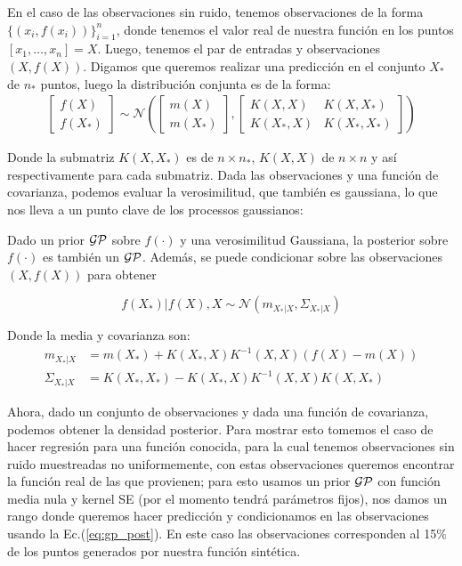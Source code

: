  En el caso de las observaciones sin ruido, tenemos observaciones de la forma $\{(x_i, f(x_i))\}_{i=1}^{n}$, donde tenemos el valor real de nuestra función en los puntos $[x_1, \ldots, x_n]=X$. Luego, tenemos el par de entradas y observaciones $(X,f(X))$. Digamos que queremos realizar una predicción en el conjunto $X_*$ de $n_*$ puntos, luego la distribución conjunta es de la forma:
\begin{align}
	\begin{bmatrix} f(X) \\ f(X_*)  \end{bmatrix}
	\sim \mathcal{N} \left(
	\begin{bmatrix} m(X) \\ m(X_*)  \end{bmatrix}, 
	\begin{bmatrix}
		K(X, X) & K(X, X_*) \\ K(X_*, X) & K(X_*, X_*)
	\end{bmatrix}
	 \right)
\end{align}

Donde la submatriz $K(X, X_*)$ es de $n \times n_*$, $K(X, X)$ de $n \times n$ y así respectivamente para cada submatriz. Dada las observaciones y una función de covarianza, podemos evaluar la verosimilitud, que también es gaussiana, lo que nos lleva a un punto clave de los processos gaussianos:

\begin{lemma}
	Dado un prior $\mathcal{GP}$ sobre $f(\cdot)$ y una verosimilitud Gaussiana, la posterior sobre $f(\cdot)$ es también un $\mathcal{GP}$. Además, se puede condicionar sobre las observaciones $(X, f(X))$ para obtener

\begin{equation}
	f(X_*)|f(X), X  \sim \mathcal{N}(m_{X_*|X}, \Sigma_{X_*|X}) \label{eq:gp_post}
\end{equation}

Donde la media y covarianza son:
\begin{align}
	m_{X_*|X} & = m(X_*) + K(X_*, X)K^{-1}(X, X) (f(X) - m(X))\\
	 \Sigma_{X_*|X} & = K(X_*, X_*) - K(X_*, X)K^{-1}(X, X) K(X, X_*)
\end{align}
\end{lemma}

Ahora, dado un conjunto de observaciones y dada una función de covarianza, podemos obtener la densidad posterior. Para mostrar esto tomemos el caso de hacer regresión para una función conocida, para la cual tenemos observaciones sin ruido muestreadas no uniformemente, con estas observaciones queremos encontrar la función real de las que provienen; para esto usamos un prior $\mathcal{GP}$ con función media nula y kernel SE (por el momento tendrá parámetros fijos), nos damos un rango donde queremos hacer predicción y condicionamos en las observaciones usando la Ec.(\ref{eq:gp_post}). En este caso las observaciones corresponden al 15$\%$ de los puntos generados por nuestra función sintética.\\

